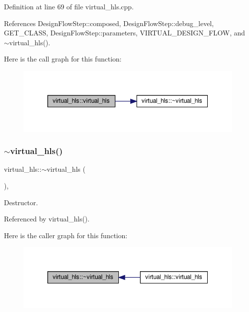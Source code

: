 Definition at line 69 of file virtual\+\_\+hls.\+cpp.



References Design\+Flow\+Step\+::composed, Design\+Flow\+Step\+::debug\+\_\+level, G\+E\+T\+\_\+\+C\+L\+A\+SS, Design\+Flow\+Step\+::parameters, V\+I\+R\+T\+U\+A\+L\+\_\+\+D\+E\+S\+I\+G\+N\+\_\+\+F\+L\+OW, and $\sim$virtual\+\_\+hls().

Here is the call graph for this function\+:
\nopagebreak
\begin{figure}[H]
\begin{center}
\leavevmode
\includegraphics[width=344pt]{d3/d16/classvirtual__hls_a59f21603b7d72db8864ccf8f504096cc_cgraph}
\end{center}
\end{figure}
\mbox{\label{classvirtual__hls_aaf2320e2bd655ec27aff49b0f7c88836}} 
\subsubsection{\texorpdfstring{$\sim$virtual\+\_\+hls()}{~virtual\_hls()}}
{\footnotesize\ttfamily virtual\+\_\+hls\+::$\sim$virtual\+\_\+hls (\begin{DoxyParamCaption}{ }\end{DoxyParamCaption})\hspace{0.3cm}{\ttfamily [override]}, {\ttfamily [default]}}



Destructor. 



Referenced by virtual\+\_\+hls().

Here is the caller graph for this function\+:
\nopagebreak
\begin{figure}[H]
\begin{center}
\leavevmode
\includegraphics[width=344pt]{d3/d16/classvirtual__hls_aaf2320e2bd655ec27aff49b0f7c88836_icgraph}
\end{center}
\end{figure}


